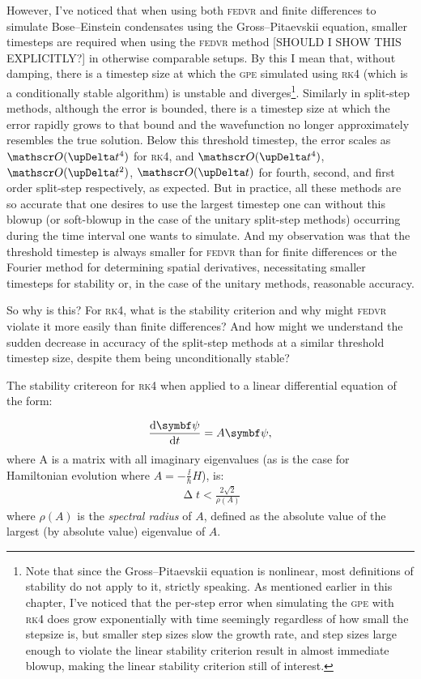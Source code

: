 However, I've noticed that when using both \textsc{fedvr} and finite differences to simulate Bose--Einstein condensates using the Gross--Pitaevskii equation, smaller timesteps are required when using the \textsc{fedvr} method [SHOULD I SHOW THIS EXPLICITLY?] in otherwise comparable setups. By this I mean that, without damping, there is a timestep size at which the \textsc{gpe} simulated using \textsc{rk4} (which is a conditionally stable algorithm) is unstable and diverges\footnote{Note that since the Gross--Pitaevskii equation is nonlinear, most definitions of stability do not apply to it, strictly speaking. As mentioned earlier in this chapter, I've noticed that the per-step error when simulating the \textsc{gpe} with \textsc{rk4} does grow exponentially with time seemingly regardless of how small the stepsize is, but smaller step sizes slow the growth rate, and step sizes large enough to violate the linear stability criterion result in almost immediate blowup, making the linear stability criterion still of interest.}. Similarly in split-step methods, although the error is bounded, there is a timestep size at which the error rapidly grows to that bound and the wavefunction no longer approximately resembles the true solution. Below this threshold timestep, the error scales as $\Ord{\upDelta t^4}$ for \textsc{rk4}, and $\Ord{\upDelta t^4}$, $\Ord{\upDelta t^2}$, $\Ord{\upDelta t}$ for fourth, second, and first order split-step respectively, as expected. But in practice, all these methods are so accurate that one desires to use the largest timestep one can without this blowup (or soft-blowup in the case of the unitary split-step methods) occurring during the time interval one wants to simulate. And my observation was that the threshold timestep is always smaller for \textsc{fedvr} than for finite differences or the Fourier method for determining spatial derivatives, necessitating smaller timesteps for stability or, in the case of the unitary methods, reasonable accuracy.

So why is this? For \textsc{rk4}, what is the stability criterion and why might \textsc{fedvr} violate it more easily than finite differences? And how might we understand the sudden decrease in accuracy of the split-step methods at a similar threshold timestep size, despite them being unconditionally stable?

The stability critereon for \textsc{rk4} when applied to a linear differential equation of the form:

\begin{align}
\dv{\vec\psi}{t} = A\vec\psi,
\end{align}
where A is a matrix with all imaginary eigenvalues (as is the case for Hamiltonian evolution where $A=-\frac \ii \hbar H$), is\cite{caplan_numerical_2011-1}:
\begin{align}
\upDelta t < \frac{2 \sqrt 2}{\rho(A)}
\end{align}
where $\rho(A)$ is the \emph{spectral radius} of $A$, defined as the absolute value of the largest (by absolute value) eigenvalue of $A$.

